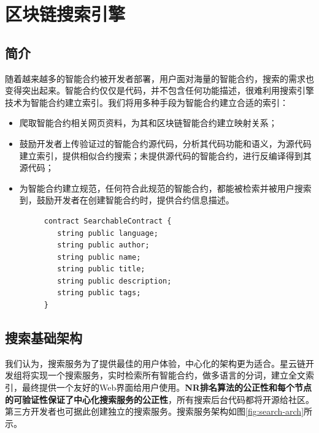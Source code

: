\section{区块链搜索引擎}
\label{sec:search}

\subsection{简介}

随着越来越多的智能合约被开发者部署，用户面对海量的智能合约，搜索的需求也变得突出起来。智能合约仅仅是代码，并不包含任何功能描述，很难利用搜索引擎技术为智能合约建立索引。我们将用多种手段为智能合约建立合适的索引：
\begin{itemize}
	\item 爬取智能合约相关网页资料，为其和区块链智能合约建立映射关系；
	\item 鼓励开发者上传验证过的智能合约源代码，分析其代码功能和语义，为源代码建立索引，提供相似合约搜索；未提供源代码的智能合约，进行反编译得到其源代码；
	\item 为智能合约建立规范，任何符合此规范的智能合约，都能被检索并被用户搜索到，鼓励开发者在创建智能合约时，提供合约信息描述。 \\

	\begin{figure}[ht]
  	\centering
  	\begin{minipage}{.4\linewidth}
	\begin{lstlisting}[frame=single]
contract SearchableContract {
   string public language;
   string public author;
   string public name;
   string public title;
   string public description;
   string public tags;
}
	\end{lstlisting}
  	\end{minipage}
	\end{figure}

\end{itemize}

\subsection{搜索基础架构}

我们认为，搜索服务为了提供最佳的用户体验，中心化的架构更为适合。星云链开发组将实现一个搜索服务，实时检索所有智能合约，做多语言的分词，建立全文索引，最终提供一个友好的Web界面给用户使用。\textbf{NR排名算法的公正性和每个节点的可验证性保证了中心化搜索服务的公正性}，所有搜索后台代码都将开源给社区。第三方开发者也可据此创建独立的搜索服务。搜索服务架构如图\ref{fig:search-arch}所示。

